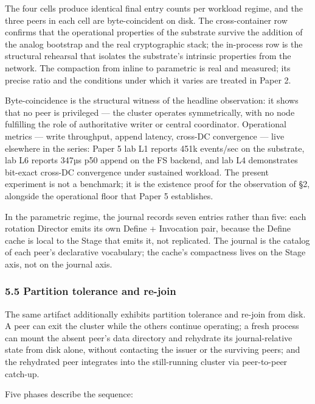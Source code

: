 \documentclass[
]{article}
\begin{document}
The four cells produce identical final entry counts per workload regime,
and the three peers in each cell are byte-coincident on disk. The
cross-container row confirms that the operational properties of the
substrate survive the addition of the analog bootstrap and the real
cryptographic stack; the in-process row is the structural rehearsal that
isolates the substrate's intrinsic properties from the network. The
compaction from inline to parametric is real and measured; its precise
ratio and the conditions under which it varies are treated in Paper 2.

Byte-coincidence is the structural witness of the headline observation:
it shows that no peer is privileged --- the cluster operates
symmetrically, with no node fulfilling the role of authoritative writer
or central coordinator. Operational metrics --- write throughput, append
latency, cross-DC convergence --- live elsewhere in the series: Paper 5
lab L1 reports 451k events/sec on the substrate, lab L6 reports 347µs
p50 append on the FS backend, and lab L4 demonstrates bit-exact cross-DC
convergence under sustained workload. The present experiment is not a
benchmark; it is the existence proof for the observation of §2,
alongside the operational floor that Paper 5 establishes.

In the parametric regime, the journal records seven entries rather than
five: each rotation Director emits its own Define + Invocation pair,
because the Define cache is local to the Stage that emits it, not
replicated. The journal is the catalog of each peer's declarative
vocabulary; the cache's compactness lives on the Stage axis, not on the
journal axis.

\subsubsection{5.5 Partition tolerance and
re-join}\label{partition-tolerance-and-re-join}

The same artifact additionally exhibits partition tolerance and re-join
from disk. A peer can exit the cluster while the others continue
operating; a fresh process can mount the absent peer's data directory
and rehydrate its journal-relative state from disk alone, without
contacting the issuer or the surviving peers; and the rehydrated peer
integrates into the still-running cluster via peer-to-peer catch-up.

Five phases describe the sequence:
\end{document}

